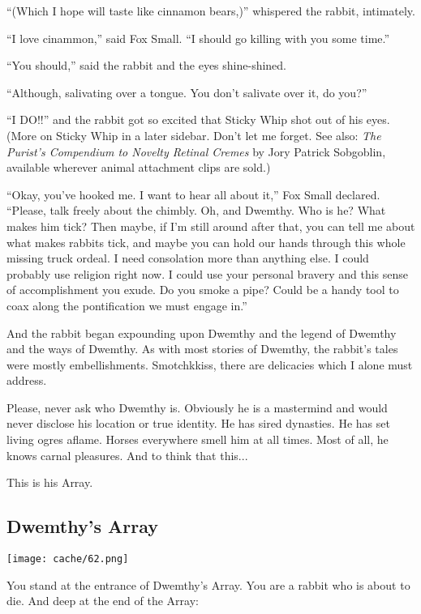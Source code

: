 \documentclass[12pt,twoside]{report}
\begin{document}
``(Which I hope will taste like cinnamon bears,)'' whispered the
rabbit, intimately.

``I love cinammon,'' said Fox Small.  ``I should go killing with you
some time.''

``You should,'' said the rabbit and the eyes shine-shined.

``Although, salivating over a tongue.  You don't salivate over it, do
you?''

``I DO!!'' and the rabbit got so excited that Sticky Whip shot out of
his eyes.  (More on Sticky Whip in a later sidebar. Don't let me
forget.  See also: {\em The Purist's Compendium to Novelty Retinal
  Cremes} by Jory Patrick Sobgoblin, available wherever animal
attachment clips are sold.)

``Okay, you've hooked me.  I want to hear all about it,'' Fox Small
declared. ``Please, talk freely about the chimbly.  Oh, and Dwemthy.
Who is he?  What makes him tick?  Then maybe, if I'm still around
after that, you can tell me about what makes rabbits tick, and maybe
you can hold our hands through this whole missing truck ordeal. I need
consolation more than anything else.  I could probably use religion
right now.  I could use your personal bravery and this sense of
accomplishment you exude.  Do you smoke a pipe?  Could be a handy tool
to coax along the pontification we must engage in.''

And the rabbit began expounding upon Dwemthy and the legend of Dwemthy
and the ways of Dwemthy. As with most stories of Dwemthy, the rabbit's
tales were mostly embellishments. Smotchkkiss, there are delicacies
which I alone must address.

Please, never ask who Dwemthy is. Obviously he is a mastermind and
would never disclose his location or true identity. He has sired
dynasties. He has set living ogres aflame. Horses everywhere smell him
at all times. Most of all, he knows carnal pleasures. And to think
that this...

This is his Array.



\subsection{Dwemthy's Array}



	\texttt{[image: cache/62.png]}

You stand at the entrance of Dwemthy's Array.  You are a rabbit who is
about to die. And deep at the end of the Array:
\end{document}
